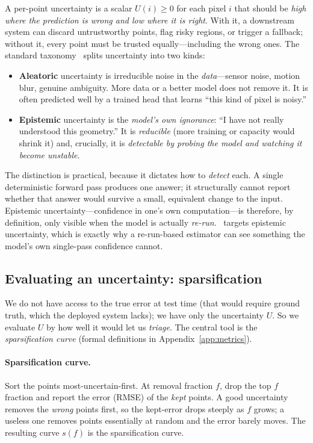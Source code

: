 A per-point uncertainty is a scalar $U(i)\ge 0$ for each pixel $i$ that should be \emph{high where
the prediction is wrong and low where it is right}. With it, a downstream system can discard
untrustworthy points, flag risky regions, or trigger a fallback; without it, every point must be
trusted equally---including the wrong ones. The standard taxonomy~\cite{kendallgal} splits
uncertainty into two kinds:

\begin{itemize}[leftmargin=1.4em,itemsep=2pt,topsep=2pt]
\item \textbf{Aleatoric} uncertainty is irreducible noise in the \emph{data}---sensor noise, motion
blur, genuine ambiguity. More data or a better model does not remove it. It is often predicted well
by a trained head that learns ``this kind of pixel is noisy.''
\item \textbf{Epistemic} uncertainty is the \emph{model's own ignorance}: ``I have not really
understood this geometry.'' It is \emph{reducible} (more training or capacity would shrink it) and,
crucially, it is \emph{detectable by probing the model and watching it become unstable}.
\end{itemize}

The distinction is practical, because it dictates how to \emph{detect} each. A single deterministic
forward pass produces one answer; it structurally cannot report whether that answer would survive a
small, equivalent change to the input. Epistemic uncertainty---confidence in one's own
computation---is therefore, by definition, only visible when the model is actually \emph{re-run}.
\trustr\ targets epistemic uncertainty, which is exactly why a re-run-based estimator can see
something the model's own single-pass confidence cannot.

\subsection{Evaluating an uncertainty: sparsification}
\label{sec:primer-metrics}

We do not have access to the true error at test time (that would require ground truth, which the
deployed system lacks); we have only the uncertainty $U$. So we evaluate $U$ by how well it would let
us \emph{triage}. The central tool is the \emph{sparsification curve} (formal definitions in
Appendix~\ref{app:metrics}).

\paragraph{Sparsification curve.} Sort the points most-uncertain-first. At removal fraction $f$, drop
the top $f$ fraction and report the error (RMSE) of the \emph{kept} points. A good uncertainty
removes the \emph{wrong} points first, so the kept-error drops steeply as $f$ grows; a useless one
removes points essentially at random and the error barely moves. The resulting curve $s(f)$ is the
sparsification curve.

